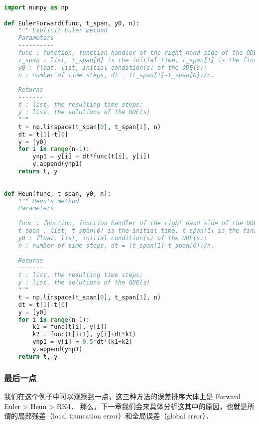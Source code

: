 \begin{lstlisting}[language=python]
import numpy as np

def EulerForward(func, t_span, y0, n):
    """ Explicit Euler method
    Parameters
    ----------
    func : function, function handler of the right hand side of the ODE(s);
    t_span : list, t_span[0] is the initial time, t_span[1] is the final time;
    y0 : float, list, initial condition(s) of the ODE(s);
    n : number of time steps, dt = (t_span[1]-t_span[0])/n.
        
    Returns
    -------
    t : list, the resulting time steps;
    y : list, the solutions of the ODE(s)
    """
    t = np.linspace(t_span[0], t_span[1], n)
    dt = t[1]-t[0]
    y = [y0]
    for i in range(n-1):
        ynp1 = y[i] + dt*func(t[i], y[i])
        y.append(ynp1)
    return t, y
    
    
def Heun(func, t_span, y0, n):
    """ Heun's method
    Parameters
    ----------
    func : function, function handler of the right hand side of the ODE(s);
    t_span : list, t_span[0] is the initial time, t_span[1] is the final time;
    y0 : float, list, initial condition(s) of the ODE(s);
    n : number of time steps, dt = (t_span[1]-t_span[0])/n.
        
    Returns
    -------
    t : list, the resulting time steps;
    y : list, the solutions of the ODE(s)
    """
    t = np.linspace(t_span[0], t_span[1], n)
    dt = t[1]-t[0]
    y = [y0]
    for i in range(n-1):
        k1 = func(t[i], y[i])
        k2 = func(t[i+1], y[i]+dt*k1)
        ynp1 = y[i] + 0.5*dt*(k1+k2)
        y.append(ynp1)
    return t, y
\end{lstlisting}

\subsubsection{最后一点}

我们在这个例子中可以观察到一点，这三种方法的误差排序大体上是 Forward Euler > Heun > RK4． 那么，下一章我们会来具体分析这其中的原因，也就是所谓的局部残差（local truncation error）和全局误差（global error）．
